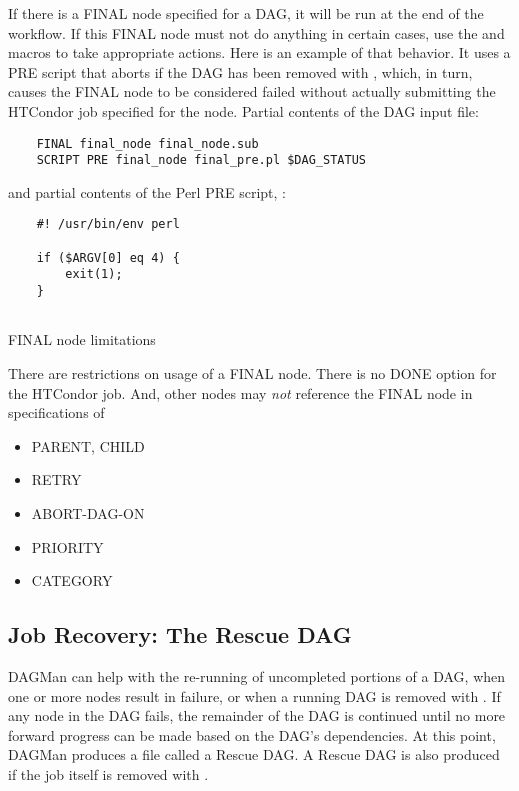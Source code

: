 If there is a FINAL node specified for a DAG, 
it will be run at the end of the workflow.
If this FINAL node must not do anything in certain cases, 
use the  and 
macros to take appropriate actions.  
Here is an example of that behavior.
It uses a PRE script that aborts if the DAG has been removed with ,
which, in turn,
causes the FINAL node to be considered failed without actually submitting the
HTCondor job specified for the node.
Partial contents of the DAG input file:
\begin{verbatim}
    FINAL final_node final_node.sub
    SCRIPT PRE final_node final_pre.pl $DAG_STATUS
\end{verbatim}

and partial contents of the Perl PRE script, :
\begin{verbatim}
    #! /usr/bin/env perl
    
    if ($ARGV[0] eq 4) {
        exit(1);
    }
   
\end{verbatim}


\begin{description}
\item[FINAL node limitations]
\end{description}

There are restrictions on usage of a FINAL node.
There is no DONE option for the HTCondor job.
And, other nodes may \emph{not} reference the FINAL node in specifications of 
\begin{itemize}
\item PARENT, CHILD
\item RETRY
\item ABORT-DAG-ON
\item PRIORITY
\item CATEGORY
\end{itemize}

\subsection{\label{sec:DAGMan-rescue}Job Recovery:  The Rescue DAG}

DAGMan can help with the re-running of uncompleted portions of a DAG, 
when one or more nodes result in failure,
or when a running DAG is removed with .
If any node in the DAG fails,
the remainder of the DAG is continued until no more forward
progress can be made based on the DAG's dependencies.
At this point, DAGMan produces a file called a Rescue DAG.  
A Rescue DAG is also produced if the
 job itself is removed with .

